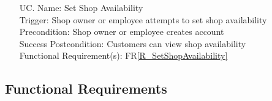 \documentclass[12pt]{article}
\newcounter{ucnum} %
\begin{document}
\begin{itemize}
\item[UC\refstepcounter{ucnum}\theucnum \label{UC_SetShopAvailability}. ]
Name: Set Shop Availability\\
Trigger: Shop owner or employee attempts to set shop availability\\
Precondition: Shop owner or employee creates account\\
Success Postcondition: Customers can view shop availability\\
Functional Requirement(s): FR\ref{R_SetShopAvailability}

\end{itemize}

\subsection{Functional Requirements}
\end{document}
